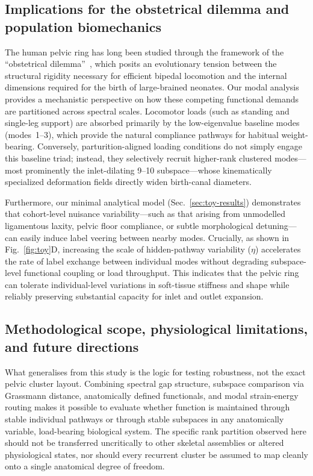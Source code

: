 \documentclass[11pt]{article}
\begin{document}
\subsection*{Implications for the obstetrical dilemma and population biomechanics}

The human pelvic ring has long been studied through the framework of the ``obstetrical dilemma''~\citep{Washburn1960,Gruss2015}, which posits an evolutionary tension between the structural rigidity necessary for efficient bipedal locomotion and the internal dimensions required for the birth of large-brained neonates.
Our modal analysis provides a mechanistic perspective on how these competing functional demands are partitioned across spectral scales.
Locomotor loads (such as standing and single-leg support) are absorbed primarily by the low-eigenvalue baseline modes (modes~1--3), which provide the natural compliance pathways for habitual weight-bearing.
Conversely, parturition-aligned loading conditions do not simply engage this baseline triad; instead, they selectively recruit higher-rank clustered modes---most prominently the inlet-dilating 9--10 subspace---whose kinematically specialized deformation fields directly widen birth-canal diameters.

Furthermore, our minimal analytical model (Sec.~\ref{sec:toy-results}) demonstrates that cohort-level nuisance variability---such as that arising from unmodelled ligamentous laxity, pelvic floor compliance, or subtle morphological detuning---can easily induce label veering between nearby modes.
Crucially, as shown in Fig.~\ref{fig:toy}D, increasing the scale of hidden-pathway variability ($\eta$) accelerates the rate of label exchange between individual modes without degrading subspace-level functional coupling or load throughput.
This indicates that the pelvic ring can tolerate individual-level variations in soft-tissue stiffness and shape while reliably preserving substantial capacity for inlet and outlet expansion.


\subsection*{Methodological scope, physiological limitations, and future directions}

What generalises from this study is the logic for testing robustness, not the exact pelvic cluster layout.
Combining spectral gap structure, subspace comparison via Grassmann distance, anatomically defined functionals, and modal strain-energy routing makes it possible to evaluate whether function is maintained through stable individual pathways or through stable subspaces in any anatomically variable, load-bearing biological system.
The specific rank partition observed here should not be transferred uncritically to other skeletal assemblies or altered physiological states, nor should every recurrent cluster be assumed to map cleanly onto a single anatomical degree of freedom.
\end{document}
